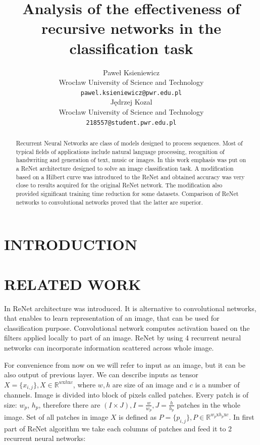 \documentclass[a4paper, 10 pt, conference]{ieeeconf}
\title{\LARGE \bf
Analysis of the effectiveness of recursive
networks in the classification task
}
\author{\parbox{2 in}{\centering Paweł Ksieniewicz \\
        Wrocław University of Science and Technology\\
        {\tt\small pawel.ksieniewicz@pwr.edu.pl}}
        \hspace*{ 0.3 in}
        \parbox{2 in}{\centering Jędrzej Kozal \\
        Wrocław University of Science and Technology\\
        {\tt\small 218557@student.pwr.edu.pl}}
}
\begin{document}
\maketitle
\thispagestyle{empty}
\pagestyle{empty}

\begin{abstract}

Recurrent Neural Networks are class of models designed to process sequences. Most of typical fields of applications include natural language processing, recognition of handwriting and generation of text, music or images. In this work emphasis was put on a ReNet architecture designed to solve an image classification task. A modification based on a Hilbert curve was introduced to the ReNet and obtained accuracy was very close to results acquired for the original ReNet network. The modification also provided significant training time reduction for some datasets. Comparison of ReNet networks to convolutional networks proved that the latter are superior.

\end{abstract}


\section{INTRODUCTION}

\cite{Goodfellow-et-al-2016}

 

\section{RELATED WORK}

In \cite{DBLP:journals/corr/VisinKCMCB15} ReNet architecture was introduced. It is alternative to convolutional networks, that enables to learn representation of an image, that can be used for classification purpose. Convolutional network computes activation based on the filters applied locally to part of an image. ReNet by using 4 recurrent neural networks can incorporate information scattered across whole image.

For convenience from now on we will refer to input as an image, but it can be also output of previous layer. We can describe inputs as tensor $X = \{x_{i,j}\}, X \in \mathbb{R}^{w \textrm{x} h \textrm{x} c}$, where $w, h$ are size of an image and $c$ is a number of channels. Image is divided into block of pixels called patches. Every patch is of size: $w_p$, $h_p$, therefore there are $(I \times J),I=\frac{w}{w_p}, J=\frac{h}{h_p}$ patches in the whole image. Set of all patches in image $X$ is defined as $P = \{p_{i,j}\}, P \in \mathbb{R}^{w_p \textrm{x} h_p \textrm{x} c}$. In first part of ReNet algorithm we take each columns of patches and feed it to 2 recurrent neural networks: 
\end{document}
